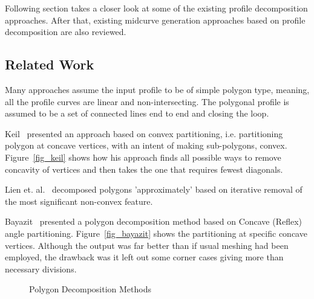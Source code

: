 Following section takes a closer look at some of the existing profile decomposition approaches. After that, existing midcurve generation approaches based on profile decomposition are also reviewed.


\subsection{Related Work}

Many approaches assume the input profile to be of simple polygon type, meaning, all the profile curves are linear and non-intersecting. The polygonal profile is assumed to be a set of connected lines end to end and closing the loop.

Keil~\cite{Keil94} presented an approach based on convex partitioning, i.e. partitioning polygon at concave vertices, with an intent of making sub-polygons, convex. Figure~\ref{fig_keil} shows how his approach finds all possible ways to remove concavity of vertices and then takes the one that requires fewest diagonals.

Lien et. al.~\cite{Lien2004} decomposed polygons 'approximately' based on iterative removal of the most significant non-convex feature. 

Bayazit~\cite{Bayazit} presented a polygon decomposition method based on Concave (Reflex) angle partitioning. Figure~\ref{fig_bayazit} shows the partitioning at specific concave vertices. Although the output was far better than if usual meshing had been employed, the drawback was it left out some corner cases giving more than necessary divisions.


	\begin{figure}[!h]
	\centering     %
	 \quad
	\caption{Polygon Decomposition Methods} %
	\label{fig:litsurvey:polydecomp}
	\end{figure}
	
